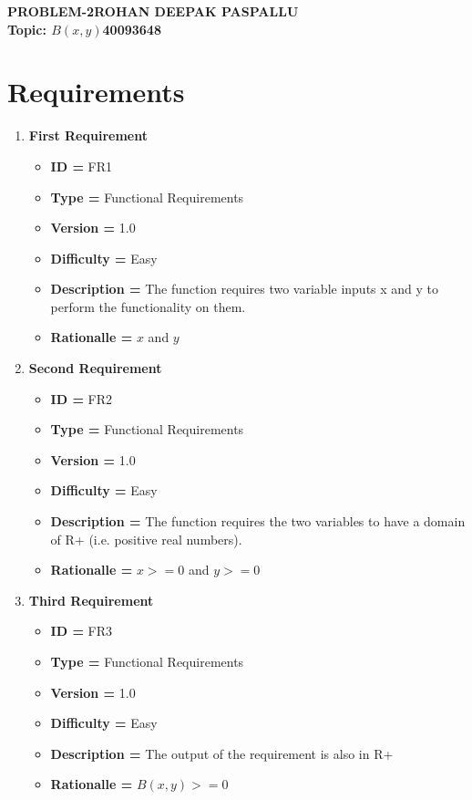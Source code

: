 \documentclass{article}
\begin{document}
\noindent
\Large\textbf{PROBLEM-2}\hfill\textbf{ROHAN DEEPAK PASPALLU}\\
\textbf{Topic: $B(x,y)$}\hfill\textbf{40093648}
\section*{Requirements}
    \begin{enumerate}[noitemsep]
        \item \textbf{First Requirement}
        \begin{itemize}[noitemsep]
            \item \textbf{ID = } FR1
            \item\textbf{Type = } Functional Requirements
            \item\textbf{Version = } 1.0
            \item\textbf{Difficulty = } Easy
            \item\textbf{Description = } The function requires two variable inputs x and y to perform the functionality on them.
            \item\textbf{Rationalle = } $x$ and $y$ 
        \end{itemize}
        \newline
        \item \textbf{Second Requirement}
        \begin{itemize}
            \item \textbf{ID = } FR2
            \item\textbf{Type = } Functional Requirements
            \item\textbf{Version = } 1.0
            \item\textbf{Difficulty = } Easy
            \item\textbf{Description = } The function requires the two variables to have a domain of R+ (i.e. positive real numbers).
            \item\textbf{Rationalle = } $x>=0$ and $y>=0$ 
        \end{itemize}
        \newline
        \item \textbf{Third Requirement}
        \begin{itemize}
            \item \textbf{ID = } FR3
            \item\textbf{Type = } Functional Requirements
            \item\textbf{Version = } 1.0
            \item\textbf{Difficulty = } Easy
            \item\textbf{Description = } The output of the requirement is also in R+
            \item\textbf{Rationalle = } $B(x,y)>=0$ 
        \end{itemize}
        

\end{enumerate}
\end{document}
